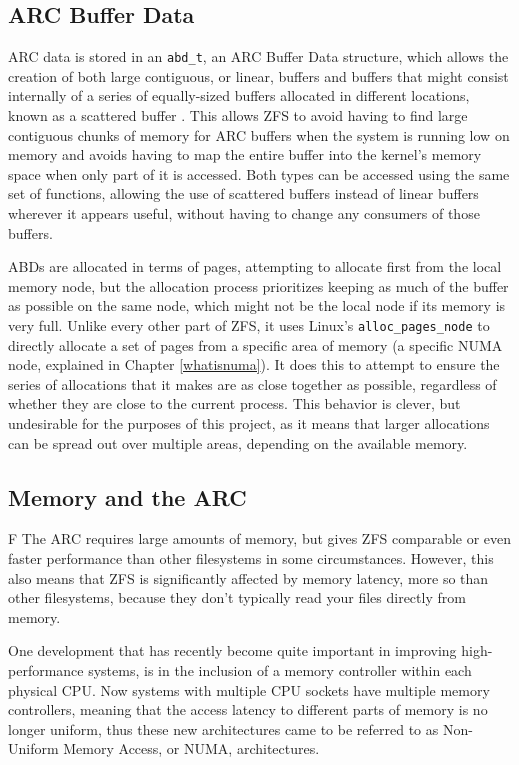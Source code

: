 \subsection{ARC Buffer Data}
\label{chapter:ABD}
ARC data is stored in an \texttt{abd\_t}, an ARC Buffer Data structure, which allows the creation of both
large contiguous, or linear, buffers and buffers that might consist internally of a series of equally-sized buffers allocated in different locations, 
known as a scattered buffer \cite[{module/zfs/abd.c}]{zfs}.
This allows ZFS to avoid having to find large contiguous chunks of memory for ARC buffers when the system is running low on memory 
and  avoids having to map the entire buffer into the kernel's memory space when only part of it is accessed.
Both types can be accessed using the same set of functions, allowing the use of scattered buffers instead of linear buffers
wherever it appears useful, without having to change any consumers of those buffers.

ABDs are allocated in terms of pages, attempting to allocate first from the local memory node, 
but the allocation process prioritizes keeping as much of the 
buffer as possible on the same node, which might not be the local node if its memory is very full.
Unlike every other part of ZFS, it uses Linux's \texttt{alloc\_pages\_node} to directly allocate a set of pages
from a specific area of memory (a specific NUMA node, explained in Chapter \ref{whatisnuma}).
It does this to attempt to ensure the series of allocations that it makes are as close together as possible,
regardless of whether they are close to the current process.
This behavior is clever, but undesirable for the purposes of this project, as it means that larger allocations
can be spread out over multiple areas, depending on the available memory.

\subsection{Memory and the ARC}F
The ARC requires large amounts of memory, but gives ZFS comparable or even faster performance than other filesystems in some 
circumstances.
However, this also means that ZFS is significantly affected by memory latency, more so than other filesystems, because they don't typically 
read your files directly from memory.

One development that has recently become quite important in improving high-performance systems, 
is in the inclusion of a memory controller within each physical CPU\cite{lameter_numa_2013}.
Now systems with multiple CPU sockets have multiple memory controllers, 
meaning that the access latency to different parts of memory is no longer uniform,
thus these new architectures came to be referred to as Non-Uniform Memory Access, or NUMA, architectures.

